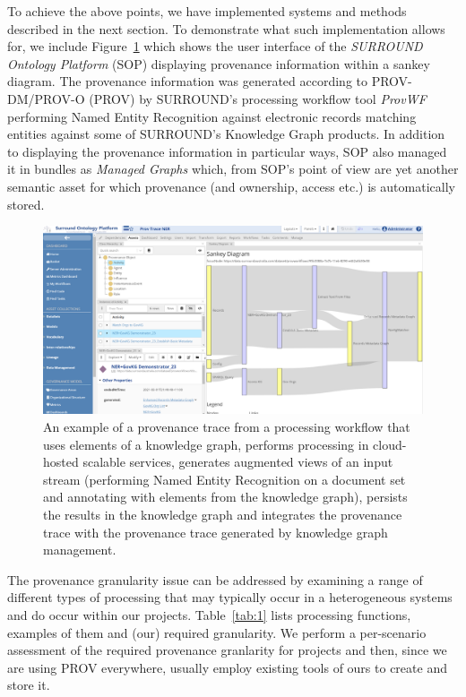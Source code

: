\documentclass[letterpaper,twocolumn,10pt]{article}
\begin{document}
To achieve the above points, we have implemented systems and methods described in the next section. To demonstrate what such implementation
allows for, we include Figure~\ref{fig:sankey} which shows the user interface of the \textit{SURROUND Ontology Platform} (SOP) displaying provenance 
information within a sankey diagram. The provenance information was generated according to PROV-DM/PROV-O (PROV) by SURROUND's processing workflow tool 
\textit{ProvWF} performing Named Entity Recognition against electronic records matching entities against some of SURROUND's Knowledge Graph products. In addition to displaying the provenance information in particular ways, SOP also managed it in bundles as \textit{Managed Graphs} which, from SOP's point of view are yet another semantic asset for which provenance (and ownership, access etc.) is automatically stored.

\begin{figure}
  \begin{center}
    \includegraphics[width=\textwidth]{images/sankey.png}
  \end{center}
  \caption{\label{fig:sankey} An example of a provenance trace from a processing workflow that uses elements of a knowledge graph, performs processing in cloud-hosted scalable services, generates augmented views of an input stream (performing Named Entity Recognition on a document set and annotating with elements from the knowledge graph), persists the results in the knowledge graph and integrates the provenance trace with the provenance trace generated by knowledge graph management.}
  \end{figure}

The provenance granularity issue can be addressed by examining a range of different types of processing that may typically 
occur in a heterogeneous systems and do occur within our projects. Table~\ref{tab:1} lists processing functions, examples of them and (our) required granularity. We perform a per-scenario assessment of the required provenance granlarity for projects and then, since we are using PROV everywhere,
usually employ existing tools of ours to create and store it.
\end{document}
